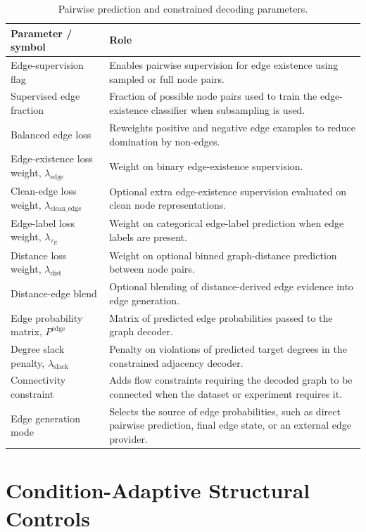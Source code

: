 \begin{table}[p]
\centering
\footnotesize
\begin{tabularx}{\textwidth}{@{}p{}X@{}}
\toprule
Parameter / symbol & Role \\
\midrule
Edge-supervision flag & Enables pairwise supervision for edge existence using sampled or full node pairs. \\
Supervised edge fraction & Fraction of possible node pairs used to train the edge-existence classifier when subsampling is used. \\
Balanced edge loss & Reweights positive and negative edge examples to reduce domination by non-edges. \\
Edge-existence loss weight, \(\lambda_{\mathrm{edge}}\) & Weight on binary edge-existence supervision. \\
Clean-edge loss weight, \(\lambda_{\mathrm{clean\_edge}}\) & Optional extra edge-existence supervision evaluated on clean node representations. \\
Edge-label loss weight, \(\lambda_{\tau_E}\) & Weight on categorical edge-label prediction when edge labels are present. \\
Distance loss weight, \(\lambda_{\mathrm{dist}}\) & Weight on optional binned graph-distance prediction between node pairs. \\
Distance-edge blend & Optional blending of distance-derived edge evidence into edge generation. \\
Edge probability matrix, \(P^{\mathrm{edge}}\) & Matrix of predicted edge probabilities passed to the graph decoder. \\
Degree slack penalty, \(\lambda_{\mathrm{slack}}\) & Penalty on violations of predicted target degrees in the constrained adjacency decoder. \\
Connectivity constraint & Adds flow constraints requiring the decoded graph to be connected when the dataset or experiment requires it. \\
Edge generation mode & Selects the source of edge probabilities, such as direct pairwise prediction, final edge state, or an external edge provider. \\
\bottomrule
\end{tabularx}
\caption{Pairwise prediction and constrained decoding parameters.}
\label{tab:generator-decoding-parameters}
\end{table}

\section{Condition-Adaptive Structural Controls}

